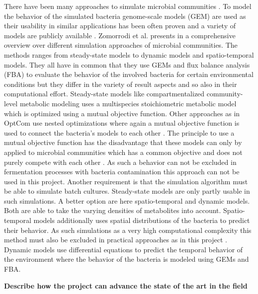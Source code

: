 There have been many approaches to simulate microbial communities \cite{ZOMORRODI2016837}. To model the behavior of the simulated bacteria
genome-scale models (GEM) are used as their usability in similar applications has been often proven and a variety of models are publicly
available \cite{6915830}.
Zomorrodi et al. presents in \cite{ZOMORRODI2016837} a comprehensive overview over different simulation approaches of microbial communities.
The methods ranges from steady-state models to dynamic models and spatio-temporal models. They all have in common that they use GEMs and
flux balance analysis (FBA) to evaluate the behavior of the involved bacteria for certain environmental conditions but they differ in the
variety of result aspects and so also in their computational effort.
Steady-state models like compartmentalized community-level metabolic modeling uses a multispecies stoichiometric metabolic model
\cite{Stolyar92} which is optimized using a mutual objective function. Other approaches as in OptCom use nested optimizations where again
a mutual objective function is used to connect the bacteria's models to each other \cite{zomorrodi2012optcom}. The principle to use a mutual
objective function has the disadvantage that these models can only by applied to microbial communities which has a common objective and does
not purely compete with each other \cite{ZOMORRODI2016837}. As such a behavior can not be excluded in fermentation processes with bacteria
contamination this approach can not be used in this project.
Another requirement is that the simulation algorithm must be able to simulate batch cultures. Steady-state models are only partly usable in
such simulations. A better option are here spatio-temporal and dynamic models. Both are able to take the varying densities of metabolites
into account. Spatio-temporal models additionally uses spatial distributions of the bacteria to predict their behavior. As such simulations
as a very high computational complexity this method must also be excluded in practical approaches as in this project \cite{ZOMORRODI2016837}.
Dynamic models use differential equations to predict the temporal behavior of the environment where the behavior of the bacteria is modeled
using GEMs and FBA.





\noindent
\textbf{Describe how the project can advance the state of the art in the field}

